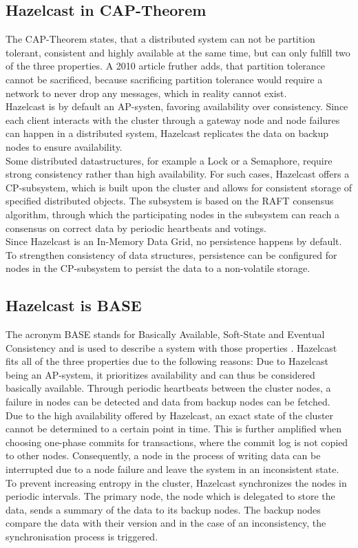 \subsection{Hazelcast in CAP-Theorem}
The CAP-Theorem states, that a distributed system can not be partition tolerant, consistent and highly available at the same time, but can only fulfill two of the three properties. A 2010 article fruther adds, that partition tolerance cannot be sacrificed, because sacrificing partition tolerance would require a network to never drop any messages, which in reality cannot exist.\parencite{Brewer2000} \parencite{CodahalePart}\\
Hazelcast is by default an AP-systen, favoring availability over consistency. Since each client interacts with the cluster through a gateway node and node failures can happen in a distributed system, Hazelcast replicates the data on backup nodes to ensure availability.\parencite{HZcap} \parencite{HZcap2}\\
Some distributed datastructures, for example a Lock or a Semaphore, require strong consistency rather than high availability. For such cases, Hazelcast offers a CP-subsystem, which is built upon the cluster and allows for consistent storage of specified distributed objects. The subsystem is based on the RAFT consensus algorithm, through which the participating nodes in the subsystem can reach a consensus on correct data by periodic heartbeats and votings.\parencite{HZcap} \parencite{HZcpsub} \parencite{WoosRaft}\\
Since Hazelcast is an In-Memory Data Grid, no persistence happens by default. To strengthen consistency of data structures, persistence can be configured for nodes in the CP-subsystem to persist the data to a non-volatile storage.\parencite{HZcpsub}
\subsection{Hazelcast is BASE}
The acronym BASE stands for Basically Available, Soft-State and Eventual Consistency and is used to describe a system with those properties \parencite{Brewer2000}. Hazelcast fits all of the three properties due to the following reasons:
Due to Hazelcast being an AP-system, it prioritizes availability and can thus be considered basically available. Through periodic heartbeats between the cluster nodes, a failure in nodes can be detected and data from backup nodes can be fetched.\parencite{HZfailure}\\
Due to the high availability offered by Hazelcast, an exact state of the cluster cannot be determined to a certain point in time. This is further amplified when choosing one-phase commits for transactions, where the commit log is not copied to other nodes. Consequently, a node in the process of writing data can be interrupted due to a node failure and leave the system in an inconsistent state. \parencite{HZtransactions}\\
To prevent increasing entropy in the cluster, Hazelcast synchronizes the nodes in periodic intervals. The primary node, the node which is delegated to store the data, sends a summary of the data to its backup nodes. The backup nodes compare the data with their version and in the case of an inconsistency, the synchronisation process is triggered.\parencite{HZreplic}
